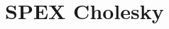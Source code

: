 \documentclass[12pt,oneside]{book}
\theoremstyle{definition}
\begin{document}
\begin{comment}
\end{itemize}

After all usage of the SPEX routines is finished, \verb|SPEX_finalize()|
must be called (Section \ref{ss:SPEX_finalize}) to finalize usage of the
library.


\cprotect\subsection{Examples}
\label{s:Using:Examples}
The \verb|SPEX/SPEX/SPEX_Left_LU/Demo| folder contains three sample C codes
which utilize SPEX. These files demonstrate the usage of SPEX as
follows:

\begin{itemize}
\item \verb|example.c|: This example generates a random dense $50 \times 50$
matrix and a random dense $50 \times 1$ right hand side vector $b$ and
solves the linear system. In this function, the \verb|SPEX_Left_LU_backslash|
function is used; and the output is given as a double matrix.

\item \verb|example2.c|: This example reads in a matrix stored in triplet
format from the \verb|ExampleMats| folder. Additionally, it reads in a
right hand side vector from this folder and solves the associated linear system
via the \verb|SPEX_Left_LU_backslash| function, and, the solution is given as a matrix
of rational numbers.

\item \verb|spexlu_demo.c|: This example reads in a matrix and right hand side
vector from a file and solves the linear system $A x = b$
using the techniques discussed in Section \ref{s:Using:expert}. This file also
allows command line arguments (discussed in \verb|README.md|) and can be used
to replicate the results from \cite{lourenco2019exact}.

\end{itemize}
\end{comment}


\chapter{SPEX Cholesky}\vspace{-0.75in} \label{ch:Chol}
\end{document}
